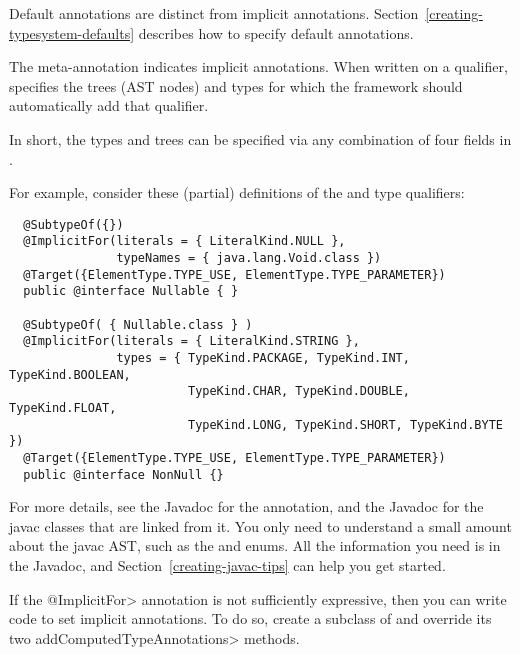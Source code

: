 Default annotations are distinct from implicit annotations.
Section~\ref{creating-typesystem-defaults} describes how to specify
default annotations.



The  meta-annotation indicates
implicit annotations.
When written on a qualifier, 
specifies the trees (AST nodes) and types for which the framework should
automatically add that qualifier.

In short, the types and trees can be
specified via any combination of four fields in .

For example, consider these (partial) definitions of the
 and
type qualifiers:

\begin{Verbatim}
  @SubtypeOf({})
  @ImplicitFor(literals = { LiteralKind.NULL },
               typeNames = { java.lang.Void.class })
  @Target({ElementType.TYPE_USE, ElementType.TYPE_PARAMETER})
  public @interface Nullable { }

  @SubtypeOf( { Nullable.class } )
  @ImplicitFor(literals = { LiteralKind.STRING },
               types = { TypeKind.PACKAGE, TypeKind.INT, TypeKind.BOOLEAN,
                         TypeKind.CHAR, TypeKind.DOUBLE, TypeKind.FLOAT,
                         TypeKind.LONG, TypeKind.SHORT, TypeKind.BYTE })
  @Target({ElementType.TYPE_USE, ElementType.TYPE_PARAMETER})
  public @interface NonNull {}
\end{Verbatim}

For more details, see the Javadoc for the 
annotation, and the Javadoc for the javac classes that are linked from
it.  You only need to understand a small amount about the javac AST, such
as the
\href{\TreeAPIBase{}/tree/Tree.Kind.html?is-external=true}{}
and
enums.  All the information you need is in the Javadoc, and
Section~\ref{creating-javac-tips} can help you get started.



If the \<@ImplicitFor> annotation is not sufficiently expressive, then you
can write code to set implicit annotations.  To do so, create a subclass of
 and override its
two \<addComputedTypeAnnotations> methods.

